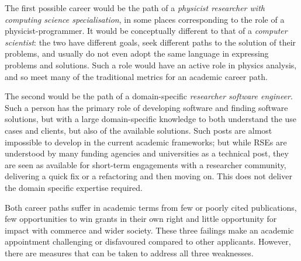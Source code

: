 \documentclass[12pt,a4paper]{article}
\begin{document}
The first possible career would be the path of a \emph{physicist researcher with
computing science specialisation}, in some places corresponding to the role of a
physicist-programmer. It would be conceptually different to that of a
\emph{computer scientist}: the two have different goals, seek different paths to
the solution of their problems, and usually do not even adopt the same language in
expressing problems and solutions. Such a role would have an active role in
physics analysis, and so meet many of the traditional metrics for an academic
career path.

The second would be the path of a domain-specific \emph{researcher software
engineer}. Such a person has the primary role of developing software and finding
software solutions, but with a large domain-specific knowledge to both
understand the use cases and clients, but also of the available solutions.  Such
posts are almost impossible to develop in the current academic frameworks; but
while RSEs are understood by many funding agencies and universities as a
technical post, they are seen as available for short-term engagements with a
researcher community, delivering a quick fix or a refactoring and then moving
on. This does not deliver the domain specific expertise required.

Both career paths suffer in academic terms from few or poorly cited
publications, few opportunities to win grants in their own right and little
opportunity for impact with commerce and wider society. These three failings
make an academic appointment challenging or disfavoured compared to other
applicants. However, there are measures that can be taken to address all three
weaknesses.




\end{document}
